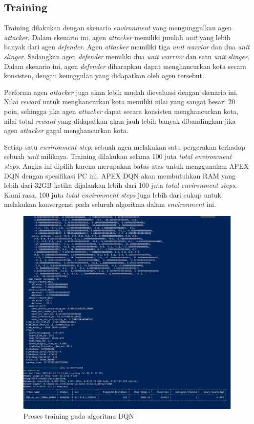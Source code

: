 \subsection{Training}
Training dilakukan dengan skenario \emph{environment} yang mengunggulkan agen \emph{attacker}.
Dalam skenario ini, agen \emph{attacker} memiliki jumlah \emph{unit} yang lebih banyak dari agen \emph{defender}.
Agen \emph{attacker} memiliki tiga \emph{unit} \emph{warrior} dan dua \emph{unit} \emph{slinger}.
Sedangkan agen \emph{defender} memiliki dua \emph{unit} \emph{warrior} dan satu \emph{unit} \emph{slinger}.
Dalam skenario ini, agen \emph{defender} diharapkan dapat menghancurkan kota secara konsisten, dengan keunggulan yang didapatkan oleh agen tersebut.

Performa agen \emph{attacker} juga akan lebih mudah dievaluasi dengan skenario ini.
Nilai \emph{reward} untuk menghancurkan kota memiliki nilai yang sangat besar: 20 poin, sehingga jika agen \emph{attacker}
dapat secara konsisten menghancurkan kota, nilai total \emph{reward} yang didapatkan akan jauh lebih banyak dibandingkan
jika agen \emph{attacker} gagal menghancurkan kota.

Setiap satu \emph{environment step}, sebuah agen melakukan satu pergerakan terhadap sebuah \emph{unit} miliknya.
Training dilakukan selama 100 juta \emph{total environment steps}.
Angka ini dipilih karena merupakan batas atas untuk menggunakan APEX DQN dengan spesifikasi PC ini.
APEX DQN akan membutuhkan RAM yang lebih dari 32GB ketika dijalankan lebih dari 100 juta \emph{total environment steps}.
Kami rasa, 100 juta \emph{total environment steps} juga lebih dari cukup untuk melakukan konvergensi pada seluruh algoritma
dalam \emph{environment} ini.

\begin{figure}[H]
  \centering
    \includegraphics[scale=0.55]{gambar/training_process.png}
    \caption{Proses training pada algoritma DQN}
    \label{fig:trainingProcess}
\end{figure}

